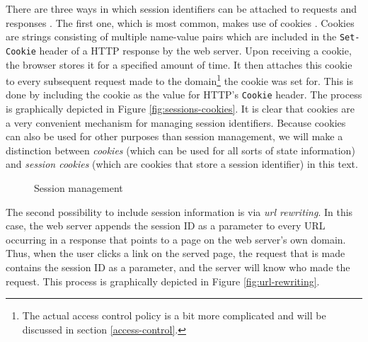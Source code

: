 \label{cookie-header}There are three ways in which session identifiers can be attached to requests and responses \cite{Jovanovic2006}. The first one, which is most common, makes use of \glspl{cookie} \cite{Kristol2001, Park2000}. Cookies are strings consisting of multiple name-value pairs which are included in the \texttt{Set-Cookie} header of a HTTP response by the web server. Upon receiving a cookie, the browser stores it for a specified amount of time. It then attaches this cookie to every subsequent request made to the domain\footnote{The actual access control policy is a bit more complicated and will be discussed in section \ref{access-control}.} the cookie was set for. This is done by including the cookie as the value for HTTP's \texttt{Cookie} header. The process is graphically depicted in Figure \ref{fig:sessions-cookies}. It is clear that cookies are a very convenient mechanism for managing session identifiers. Because cookies can also be used for other purposes than session management, we will make a distinction between \emph{cookies} (which can be used for all sorts of state information) and \emph{\glspl{session cookie}} (which are cookies that store a session identifier) in this text.

\begin{figure}[ht]
	\centering
	\caption{Session management}
\end{figure}

The second possibility to include session information is via \emph{\gls{url} rewriting}. In this case, the web server appends the session ID as a parameter to every URL occurring in a response that points to a page on the web server's own domain. Thus, when the user clicks a link on the served page, the request that is made contains the session ID as a parameter, and the server will know who made the request. This process is graphically depicted in Figure \ref{fig:url-rewriting}.

